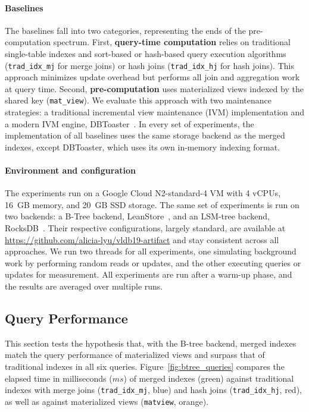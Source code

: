 \documentclass[sigconf, pdfa, nonacm]{acmart}
\newcommand\vldbavailabilityurl{https://github.com/alicia-lyu/vldb19-artifact}
\begin{document}
\paragraph{Baselines}

The baselines fall into two categories, representing the ends of the pre-computation spectrum.
First, \textbf{query-time computation} relies on traditional single-table indexes and sort-based or hash-based query execution algorithms (\texttt{trad\_idx\_mj} for merge joins) or hash joins (\texttt{trad\_idx\_hj} for hash joins). This approach minimizes update overhead but performs all join and aggregation work at query time.
Second, \textbf{pre-computation} uses materialized views indexed by the shared key (\texttt{mat\_view}). We evaluate this approach with two maintenance strategies: a traditional incremental view maintenance (IVM) implementation and a modern IVM engine, DBToaster~\cite{dbtoaster}.
In every set of experiments, the implementation of all baselines uses the same storage backend as the merged indexes, except DBToaster, which uses its own in-memory indexing format.

\begin{sloppypar}
    \paragraph{Environment and configuration}
    The experiments run on a Google Cloud N2-standard-4 VM with 4 vCPUs, 16~GB memory, and 20~GB SSD storage. 
    The same set of experiments is run on two backends: a B-Tree backend, LeanStore~\cite{leanstore18}, and an LSM-tree backend, RocksDB~\cite{rocksdb21}. 
    Their respective configurations, largely standard, are available at \url{\vldbavailabilityurl} and stay consistent across all approaches.
    We run two threads for all experiments, one simulating background work by performing random reads or updates, and the other executing queries or updates for measurement.
    All experiments are run after a warm-up phase, and the results are averaged over multiple runs.
\end{sloppypar} %

\subsection{Query Performance}\label{subsec:query_perf}

\begin{sloppypar}
This section tests the hypothesis that, with the B-tree backend, merged indexes match the query performance of materialized views and surpass that of traditional indexes in all six queries.
Figure~\ref{fig:btree_queries} compares the elapsed time in milliseconds (\(ms\)) of merged indexes (green) against traditional indexes with merge joins (\texttt{trad\_idx\_mj}, blue) and hash joins (\texttt{trad\_idx\_hj}, red), as well as against materialized views (\texttt{matview}, orange).
\end{sloppypar}
\end{document}
